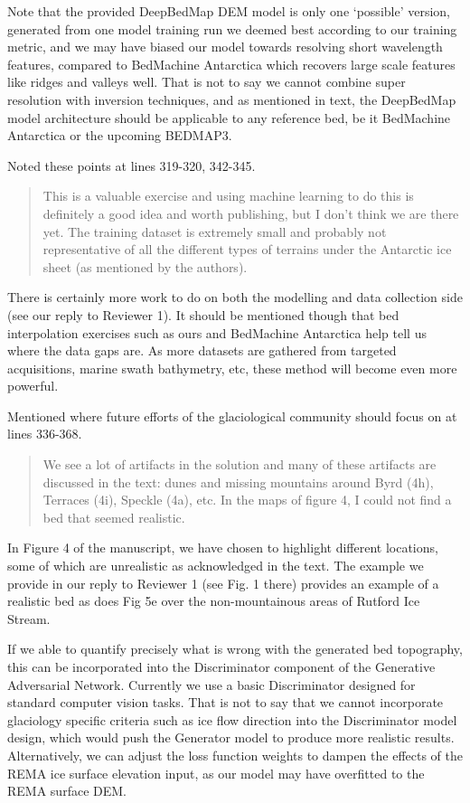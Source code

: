 \documentclass{article}
\begin{document}
Note that the provided DeepBedMap DEM model is only one `possible' version, generated from one model training run we deemed best according to our training metric, and we may have biased our model towards resolving short wavelength features, compared to BedMachine Antarctica which recovers large scale features like ridges and valleys well.
That is not to say we cannot combine super resolution with inversion techniques, and as mentioned in text, the DeepBedMap model architecture should be applicable to any reference bed, be it BedMachine Antarctica or the upcoming BEDMAP3.

{
  \color{ForestGreen}
   Noted these points at lines 319-320, 342-345.
}

\begin{quote}
\color{blue}
  This is a valuable exercise and using machine learning to do this is definitely a good idea and worth publishing, but I don’t think we are there yet.
  The training dataset is extremely small and probably not representative of all the different types of terrains under the Antarctic ice sheet (as mentioned by the authors).
\end{quote}

There is certainly more work to do on both the modelling and data collection side (see our reply to Reviewer 1).
It should be mentioned though that bed interpolation exercises such as ours and BedMachine Antarctica help tell us where the data gaps are.
As more datasets are gathered from targeted acquisitions, marine swath bathymetry, etc, these method will become even more powerful.

{
  \color{ForestGreen}
   Mentioned where future efforts of the glaciological community should focus on at lines 336-368.
}

\begin{quote}
\color{blue}
  We see a lot of artifacts in the solution and many of these artifacts are discussed in the text: dunes and missing mountains around Byrd (4h), Terraces (4i), Speckle (4a), etc.
  In the maps of figure 4, I could not find a bed that seemed realistic.
\end{quote}

In Figure 4 of the manuscript, we have chosen to highlight different locations, some of which are unrealistic as acknowledged in the text.
The example we provide in our reply to Reviewer 1 (see Fig. 1 there) provides an example of a realistic bed as does Fig 5e over the non-mountainous areas of Rutford Ice Stream.

If we able to quantify precisely what is wrong with the generated bed topography, this can be incorporated into the Discriminator component of the Generative Adversarial Network.
Currently we use a basic Discriminator designed for standard computer vision tasks.
That is not to say that we cannot incorporate glaciology specific criteria such as ice flow direction into the Discriminator model design, which would push the Generator model to produce more realistic results.
Alternatively, we can adjust the loss function weights to dampen the effects of the REMA ice surface elevation input, as our model may have overfitted to the REMA surface DEM.
\end{document}
